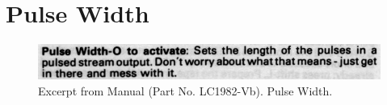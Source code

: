 \chapter{Pulse Width} 
\label{sec:pulse_width}
\lstset{style=6502Style}

\begin{figure}[H]
    \centering
    \begin{adjustbox}{width=10.5cm,margin=0cm}
      \includegraphics[width=12cm]{src/pulsewidth/pulsewidth.png}%
    \end{adjustbox}
    \caption{
      Excerpt from Manual (Part No. LC1982-Vb). Pulse Width.
      }
\end{figure}

